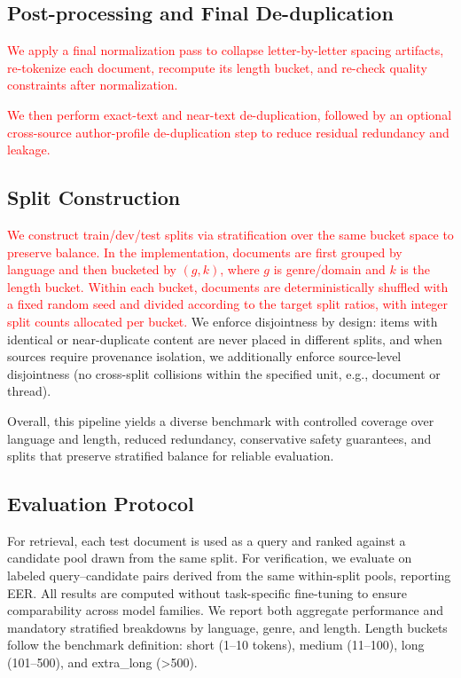 \documentclass[11pt]{article}
\newcommand{\rev}[1]{\textcolor{red}{#1}}
\begin{document}
\subsection{Post-processing and Final De-duplication}
\label{subsec:construct-post}
\rev{We apply a final normalization pass to collapse letter-by-letter spacing artifacts, re-tokenize each document, recompute its length bucket, and re-check quality constraints after normalization.}

\rev{We then perform exact-text and near-text de-duplication, followed by an optional cross-source author-profile de-duplication step to reduce residual redundancy and leakage.}

\subsection{Split Construction}
\label{subsec:construct-splits}
\rev{We construct train/dev/test splits via stratification over the same bucket space to preserve balance. In the implementation, documents are first grouped by language and then bucketed by $(g,k)$, where $g$ is genre/domain and $k$ is the length bucket. Within each bucket, documents are deterministically shuffled with a fixed random seed and divided according to the target split ratios, with integer split counts allocated per bucket.}
We enforce disjointness by design: items with identical or near-duplicate content are never placed in different splits, and when sources require provenance isolation, we additionally enforce source-level disjointness (no cross-split collisions within the specified unit, e.g., document or thread).

Overall, this pipeline yields a diverse benchmark with controlled coverage over language and length, reduced redundancy, conservative safety guarantees, and splits that preserve stratified balance for reliable evaluation.


\subsection{Evaluation Protocol}
\label{subsec:eval-protocol}
For retrieval, each test document is used as a query and ranked against a candidate pool drawn from the same split.
For verification, we evaluate on labeled query--candidate pairs derived from the same within-split pools, reporting EER.
All results are computed without task-specific fine-tuning to ensure comparability across model families.
We report both aggregate performance and mandatory stratified breakdowns by language, genre, and length.
Length buckets follow the benchmark definition: short (1--10 tokens), medium (11--100), long (101--500), and extra\_long (>500).
\end{document}
